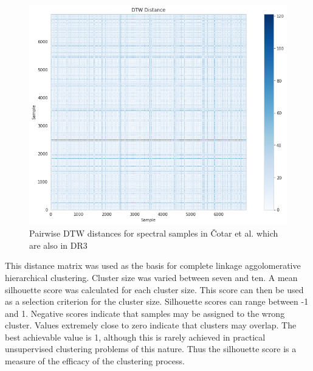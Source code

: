 \begin{figure}[!htb]
\centering
\includegraphics[scale=0.60]{figures/dtw cotar.png}
\caption{Pairwise DTW distances for spectral samples in Čotar et al. which are also in DR3}
\end{figure}

This distance matrix was used as the basis for complete linkage aggolomerative hierarchical clustering. Cluster size was varied between seven and ten. A mean silhouette score was calculated for each cluster size. This score can then be used as a selection criterion for the cluster size. Silhouette scores can range between -1 and 1. Negative scores indicate that samples may be assigned to the wrong cluster. Values extremely close to zero indicate that clusters may overlap. The best achievable value is 1, although this is rarely achieved in practical unsupervised clustering problems of this nature. Thus the silhouette score is a measure of the efficacy of the clustering process.

